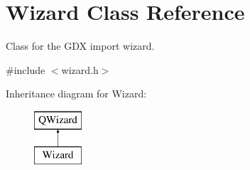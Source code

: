 \hypertarget{class_wizard}{}\section{Wizard Class Reference}
\label{class_wizard}


Class for the G\+D\+X import wizard.  




{\ttfamily \#include $<$wizard.\+h$>$}

Inheritance diagram for Wizard\+:\begin{figure}[H]
\begin{center}
\leavevmode
\includegraphics[height=2.000000cm]{class_wizard}
\end{center}
\end{figure}
